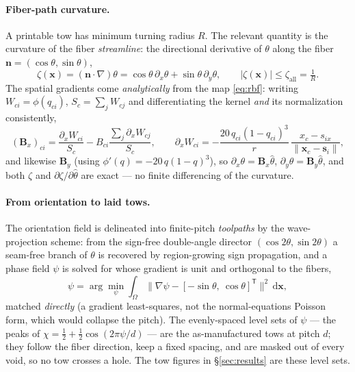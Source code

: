 \documentclass[preprint,11pt]{elsarticle}
\newcommand{\vx}{\mathbf{x}}
\newcommand{\vn}{\mathbf{n}}
\newcommand{\Tp}{^{\mathsf{T}}}
\newcommand{\rmd}{\mathrm{d}}
\newcommand{\zall}{\zeta_{\mathrm{all}}}
\theoremstyle{plain}\newtheorem{proposition}{Proposition}
\theoremstyle{remark}\newtheorem{remark}{Remark}
\begin{document}
\paragraph{Fiber-path curvature.} A printable tow has minimum turning radius $R$. The
relevant quantity is the curvature of the fiber \emph{streamline}: the directional
derivative of $\theta$ along the fiber $\vn=(\cos\theta,\sin\theta)$,
\begin{equation}
  \zeta(\vx)=(\vn\!\cdot\!\nabla)\theta=\cos\theta\,\partial_x\theta+\sin\theta\,
  \partial_y\theta,\qquad |\zeta(\vx)|\le\zall=\tfrac1R .
  \label{eq:curl}
\end{equation}
The spatial gradients come \emph{analytically} from the map \eqref{eq:rbf}: writing
$W_{ci}=\phi(q_{ci})$, $S_c=\sum_j W_{cj}$ and differentiating the kernel \emph{and} its
normalization consistently,
\begin{equation}
  (\mathbf B_x)_{ci}=\frac{\partial_x W_{ci}}{S_c}-B_{ci}\frac{\sum_j\partial_x W_{cj}}{S_c},
  \qquad
  \partial_x W_{ci}=-\frac{20\,q_{ci}(1-q_{ci})^3}{r}\,\frac{x_c-s_{ix}}{\lVert\vx_c-\mathbf
  s_i\rVert},
  \label{eq:rbfderiv}
\end{equation}
and likewise $\mathbf B_y$ (using $\phi'(q)=-20\,q(1-q)^3$), so $\partial_x\theta=\mathbf
B_x\hat\theta$, $\partial_y\theta=\mathbf B_y\hat\theta$, and both $\zeta$ and
$\partial\zeta/\partial\hat\theta$ are exact --- no finite differencing of the curvature.

\paragraph{From orientation to laid tows.} The orientation field is delineated into
finite-pitch \emph{toolpaths} by the wave-projection scheme: from the sign-free
double-angle director $(\cos2\theta,\sin2\theta)$ a seam-free branch of $\theta$ is
recovered by region-growing sign propagation, and a phase field $\psi$ is solved for whose
gradient is unit and orthogonal to the fibers,
\begin{equation}
  \psi=\arg\min_\psi\!\int_\Omega\bigl\lVert\nabla\psi-[-\sin\theta,\ \cos\theta]\Tp
  \bigr\rVert^2\,\rmd\vx ,
  \label{eq:phase}
\end{equation}
matched \emph{directly} (a gradient least-squares, not the normal-equations Poisson form,
which would collapse the pitch). The evenly-spaced level sets of $\psi$ --- the peaks of
$\chi=\tfrac12+\tfrac12\cos(2\pi\psi/d)$ --- are the as-manufactured tows at pitch $d$; they
follow the fiber direction, keep a fixed spacing, and are masked out of every void, so no
tow crosses a hole. The tow figures in \S\ref{sec:results} are these level sets.
\end{document}
